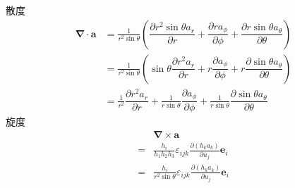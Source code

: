 散度
\begin{align}
    \boldsymbol{\nabla}\cdot\boldsymbol{a}&=\frac{1}{r^2\sin\theta}(\dfrac{\partial r^2\sin\theta a_r}{\partial r}+\dfrac{\partial ra_{\phi}}{\partial \phi}+\dfrac{\partial r\sin\theta a_\theta}{\partial \theta})\nonumber\\
    &=\frac{1}{r^2\sin\theta}(\sin\theta \dfrac{\partial r^2a_r}{\partial r}+r\dfrac{\partial a_{\phi}}{\partial \phi}+r\dfrac{\partial \sin\theta a_\theta}{\partial \theta})\nonumber\\
    &=\frac{1}{r^2}\dfrac{\partial r^2a_r}{\partial r}
    +\frac{1}{r\sin\theta}\dfrac{\partial a_{\phi}}{\partial \phi}
    +\frac{1}{r\sin\theta }\dfrac{\partial \sin\theta a_\theta}{\partial \theta}
\end{align}
旋度
\begin{align}
    &\boldsymbol{\nabla}\times\boldsymbol{a}\nonumber\\
    =&\frac{h_i}{h_1h_2h_3}\varepsilon_{ijk}\frac{\partial (h_ka_k)}{\partial u_j}\boldsymbol{e}_i\nonumber\\
    =&\frac{h_i}{r^2\sin\theta}\varepsilon_{ijk}\frac{\partial (h_ka_k)}{\partial u_j}\boldsymbol{e}_i\nonumber\\

\end{align}
